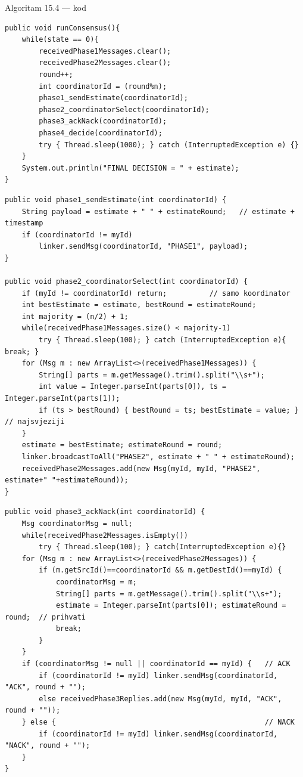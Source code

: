 \documentclass[aspectratio=169,11pt]{beamer}
\begin{document}
\begin{frame}{Algoritam 15.4 --- kod}
\begin{lstlisting}
public void runConsensus(){
    while(state == 0){
        receivedPhase1Messages.clear();
        receivedPhase2Messages.clear();
        round++;
        int coordinatorId = (round%n);
        phase1_sendEstimate(coordinatorId);
        phase2_coordinatorSelect(coordinatorId);
        phase3_ackNack(coordinatorId);
        phase4_decide(coordinatorId);
        try { Thread.sleep(1000); } catch (InterruptedException e) {}
    }
    System.out.println("FINAL DECISION = " + estimate);
}
\end{lstlisting}

\begin{lstlisting}
public void phase1_sendEstimate(int coordinatorId) {
    String payload = estimate + " " + estimateRound;   // estimate + timestamp
    if (coordinatorId != myId)
        linker.sendMsg(coordinatorId, "PHASE1", payload);
}

public void phase2_coordinatorSelect(int coordinatorId) {
    if (myId != coordinatorId) return;          // samo koordinator
    int bestEstimate = estimate, bestRound = estimateRound;
    int majority = (n/2) + 1;
    while(receivedPhase1Messages.size() < majority-1)
        try { Thread.sleep(100); } catch (InterruptedException e){ break; }
    for (Msg m : new ArrayList<>(receivedPhase1Messages)) {
        String[] parts = m.getMessage().trim().split("\\s+");
        int value = Integer.parseInt(parts[0]), ts = Integer.parseInt(parts[1]);
        if (ts > bestRound) { bestRound = ts; bestEstimate = value; }  // najsvjeziji
    }
    estimate = bestEstimate; estimateRound = round;
    linker.broadcastToAll("PHASE2", estimate + " " + estimateRound);
    receivedPhase2Messages.add(new Msg(myId, myId, "PHASE2", estimate+" "+estimateRound));
}
\end{lstlisting}

\begin{lstlisting}
public void phase3_ackNack(int coordinatorId) {
    Msg coordinatorMsg = null;
    while(receivedPhase2Messages.isEmpty())
        try { Thread.sleep(100); } catch(InterruptedException e){}
    for (Msg m : new ArrayList<>(receivedPhase2Messages)) {
        if (m.getSrcId()==coordinatorId && m.getDestId()==myId) {
            coordinatorMsg = m;
            String[] parts = m.getMessage().trim().split("\\s+");
            estimate = Integer.parseInt(parts[0]); estimateRound = round;  // prihvati
            break;
        }
    }
    if (coordinatorMsg != null || coordinatorId == myId) {   // ACK
        if (coordinatorId != myId) linker.sendMsg(coordinatorId, "ACK", round + "");
        else receivedPhase3Replies.add(new Msg(myId, myId, "ACK", round + ""));
    } else {                                                 // NACK
        if (coordinatorId != myId) linker.sendMsg(coordinatorId, "NACK", round + "");
    }
}


\end{lstlisting}
\end{frame}
\end{document}
